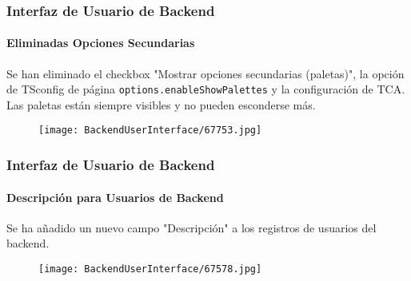 \begin{frame}[fragile]
	\frametitle{Interfaz de Usuario de Backend}
	\framesubtitle{Eliminadas Opciones Secundarias}

	Se han eliminado el checkbox "Mostrar opciones secundarias (paletas)", la opción de TSconfig de página \texttt{options.enableShowPalettes}
	y la configuración de TCA. Las paletas están siempre visibles y no pueden esconderse más.

	\begin{figure}
		\texttt{[image: BackendUserInterface/67753.jpg]}
	\end{figure}

\end{frame}

\begin{frame}[fragile]
	\frametitle{Interfaz de Usuario de Backend}
	\framesubtitle{Descripción para Usuarios de Backend}

	Se ha añadido un nuevo campo "Descripción" a los registros de usuarios del backend.

	\begin{figure}
		\texttt{[image: BackendUserInterface/67578.jpg]}
	\end{figure}

\end{frame}

